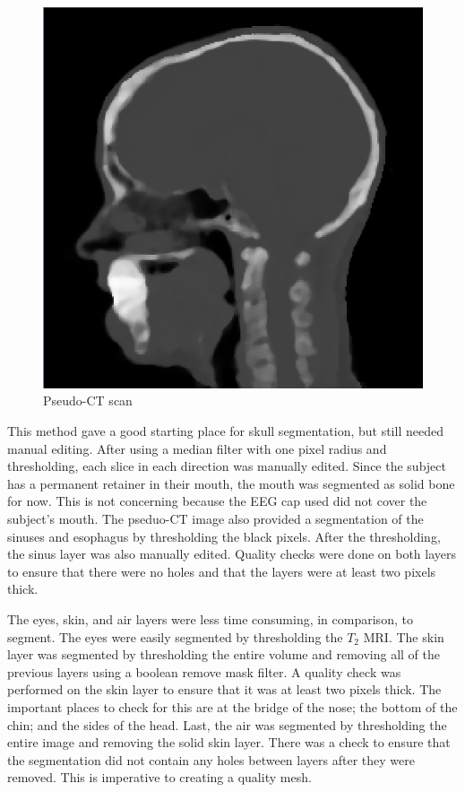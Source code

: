 \begin{figure}[H]
\begin{center}
\includegraphics[width=.75\textwidth]{Figures/pseudo_CT}
\caption{Pseudo-CT scan}
\label{fig:ct}
\end{center}
\end{figure}

This method gave a good starting place for skull segmentation, but still needed manual editing. After using a median filter with one pixel radius and thresholding, each slice in each direction was manually edited. Since the subject has a permanent retainer in their mouth, the mouth was segmented as solid bone for now. This is not concerning because the EEG cap used did not cover the subject's mouth. The pseduo-CT image also provided a segmentation of the sinuses and esophagus by thresholding the black pixels. After the thresholding, the sinus layer was also manually edited. Quality checks were done on both layers to ensure that there were no holes and that the layers were at least two pixels thick.

The eyes, skin, and air layers were less time consuming, in comparison, to segment. The eyes were easily segmented by thresholding the $T_2$ MRI. The skin layer was segmented by thresholding the entire volume and removing all of the previous layers using a boolean remove mask filter. A quality check was performed on the skin layer to ensure that it was at least two pixels thick. The important places to check for this are at the bridge of the nose; the bottom of the chin; and the sides of the head. Last, the air was segmented by thresholding the entire image and removing the solid skin layer. There was a check to ensure that the segmentation did not contain any holes between layers after they were removed. This is imperative to creating a quality mesh.

